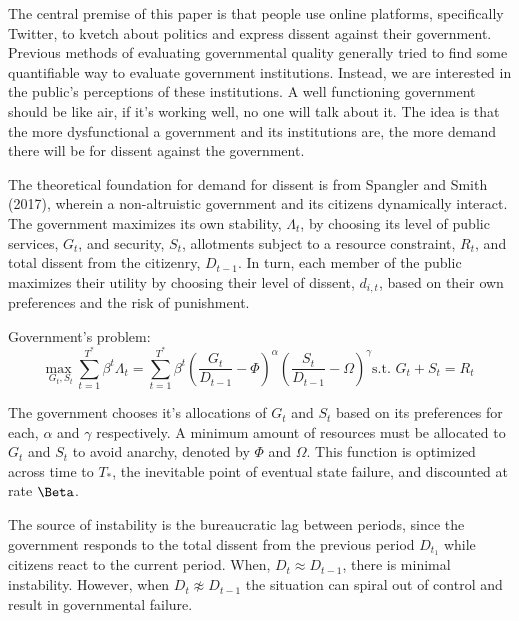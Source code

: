 \documentclass[12pt]{article}
\begin{document}
\begin{spacing}{1.5}
The central premise of this paper is that people use online platforms, specifically Twitter, to kvetch about politics and express dissent against their government. Previous methods of evaluating governmental quality generally tried to find some quantifiable way to evaluate government institutions. Instead, we are interested in the public's perceptions of these institutions. A well functioning government should be like air, if it's working well, no one will talk about it. The idea is that the more dysfunctional a government and its institutions are, the more demand there will be for dissent against the government.

The theoretical foundation for demand for dissent is from Spangler and Smith (2017), wherein a non-altruistic government and its citizens dynamically interact. The government maximizes its own stability, $\Lambda_t$, by choosing its level of public services, $G_t$, and security, $S_t$, allotments subject to a resource constraint, $R_t$, and total dissent from the citizenry, $D_{t-1}$. In turn, each member of the public maximizes their utility by choosing their level of dissent, $d_{i,t}$, based on their own preferences and the risk of punishment. 

\vspace{.5 em}

\noindent Government's problem:
\begin{equation}
{\underset{G_t,S_t}{\text{max }}} \sum\limits_{t=1}^{T^*} \beta^t {\Lambda}_t = \sum\limits_{t=1}^{T^*} \beta^t\left(\frac{G_t}{D_{t-1}}-\Phi\right)^\alpha \left(\frac{S_t}{D_{t-1}}-\Omega\right)^\gamma   \text{s.t. } G_t+S_t=R_t
\end{equation}

The government chooses it's allocations of $G_t$ and $S_t$ based on its preferences for each, $\alpha$ and $\gamma$ respectively. A minimum amount of resources must be allocated to $G_t$ and $S_t$ to avoid anarchy, denoted by $\Phi$ and $\Omega$. This function is optimized across time to $T_*$, the inevitable point of eventual state failure, and discounted at rate $\Beta$.  

The source of instability is the bureaucratic lag between periods, since the government responds to the total dissent from the previous period $D_{t_1}$ while citizens react to the current period. When, $D_t \approx D_{t-1}$, there is minimal instability. However, when $D_t \not\approx D_{t-1}$ the situation can spiral out of control and result in governmental failure. 


\end{spacing}
\end{document}
